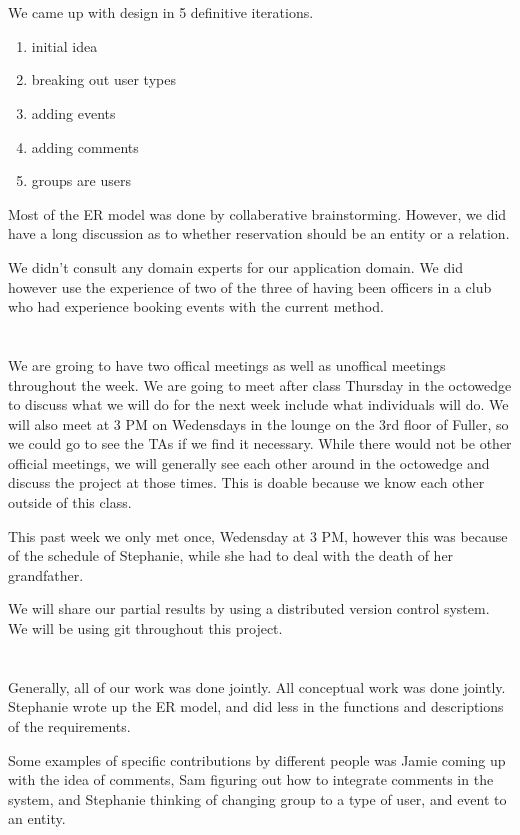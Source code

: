 \documentclass{article}
\begin{document}
\section{}
We came up with design in 5 definitive iterations. 
\begin{enumerate}
\item initial idea
\item breaking out user types
\item adding events
\item adding comments
\item groups are users
\end{enumerate}

Most of the ER model was done by collaberative brainstorming. However, we did
have a long discussion as to whether reservation should be an entity or a
relation.  

We didn't consult any domain experts for our application domain. We did however
use the experience of two of the three of having been officers in a club who had
experience booking events with the current method. 

\section{}
We are groing to have two offical meetings as well as unoffical meetings
throughout the week. We are going to meet after class Thursday in the octowedge
to discuss what we will do for the next week include what individuals will do.
We will also meet at 3 PM on Wedensdays in the lounge on the 3rd floor of
Fuller, so we could go to see the TAs if we find it necessary. While there would
not be other official meetings, we will generally see each other around in the
octowedge and discuss the project at those times. This is doable because we know
each other outside of this class. 

This past week we only met once, Wedensday at 3 PM, however this was because of
the schedule of Stephanie, while she had to deal with the death of her
grandfather. 

We will share our partial results by using a distributed version control system.
We will be using git throughout this project. 

\section{}
Generally, all of our work was done jointly. All conceptual work was done
jointly. Stephanie wrote up the ER model, and did less in the
functions and descriptions of the requirements. 

Some examples of specific contributions by different people was Jamie coming up
with the idea of comments, Sam figuring out how to integrate comments
in the system, and Stephanie thinking of changing group to a type of user, and
event to an entity. 


\end{document}
